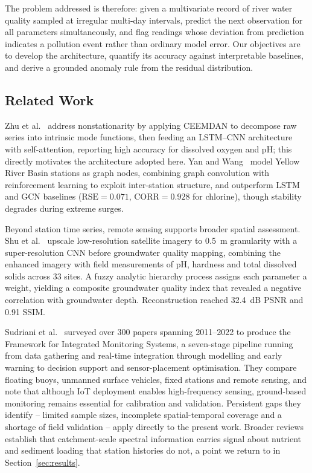 \documentclass[conference]{IEEEtran}
\begin{document}
The problem addressed is therefore: given a multivariate record of river water
quality sampled at irregular multi-day intervals, predict the next observation
for all parameters simultaneously, and flag readings whose deviation from
prediction indicates a pollution event rather than ordinary model error. Our
objectives are to develop the architecture, quantify its accuracy against
interpretable baselines, and derive a grounded anomaly rule from the residual
distribution.

\subsection{Related Work}

Zhu et al.~\cite{zhu} address nonstationarity by applying CEEMDAN to decompose
raw series into intrinsic mode functions, then feeding an LSTM--CNN
architecture with self-attention, reporting high accuracy for dissolved oxygen
and pH; this directly motivates the architecture adopted here. Yan and
Wang~\cite{yan} model Yellow River Basin stations as graph nodes, combining
graph convolution with reinforcement learning to exploit inter-station
structure, and outperform LSTM and GCN baselines ($\mathrm{RSE}=0.071$,
$\mathrm{CORR}=0.928$ for chlorine), though stability degrades during extreme
surges.

Beyond station time series, remote sensing supports broader spatial assessment.
Shu et al.~\cite{shu} upscale low-resolution satellite imagery to 0.5~m
granularity with a super-resolution CNN before groundwater quality mapping,
combining the enhanced imagery with field measurements of pH, hardness and
total dissolved solids across 33 sites. A fuzzy analytic hierarchy process
assigns each parameter a weight, yielding a composite groundwater quality index
that revealed a negative correlation with groundwater depth. Reconstruction
reached 32.4~dB PSNR and 0.91 SSIM.

Sudriani et al.~\cite{sudriani} surveyed over 300 papers spanning 2011--2022 to
produce the Framework for Integrated Monitoring Systems, a seven-stage pipeline
running from data gathering and real-time integration through modelling and
early warning to decision support and sensor-placement optimisation. They
compare floating buoys, unmanned surface vehicles, fixed stations and remote
sensing, and note that although IoT deployment enables high-frequency sensing,
ground-based monitoring remains essential for calibration and validation.
Persistent gaps they identify -- limited sample sizes, incomplete
spatial-temporal coverage and a shortage of field validation -- apply directly
to the present work. Broader reviews~\cite{sagan} establish that
catchment-scale spectral information carries signal about nutrient and sediment
loading that station histories do not, a point we return to in
Section~\ref{sec:results}.
\end{document}
